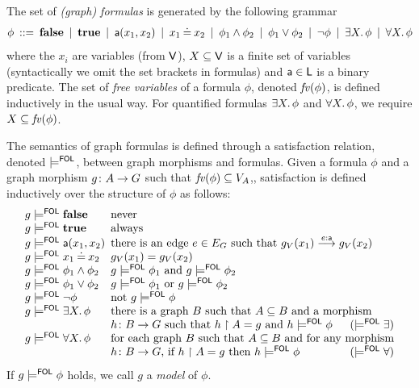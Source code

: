 \begin{definition}
  \label{def:graph-formulas}
The set of \emph{(graph) formulas} is generated by the following grammar
%
\[ \phi \:::=\: \textbf{false}
        \:\mid\: \textbf{true}
		\:\mid\: \mathsf{a}(x_1,x_2)
        \:\mid\: x_1 \mathbin{\doteq} x_2
		\:\mid\: \phi_1\wedge \phi_2
		\:\mid\: \phi_1\vee \phi_2
		\:\mid\: \neg\phi
		\:\mid\: \exists X.\, \phi 
		\:\mid\: \forall X.\, \phi 
		\]
where the $x_i$ are variables (from $\mathsf{V}$), $X\subseteq \mathsf{V}$ is a finite set of variables (syntactically we omit the set brackets in formulas) and $\mathsf{a} \in \mathsf{L}$ is a binary predicate. The set of \emph{free variables} of a formula $\phi$, denoted $\mathit{fv}(\phi)$, is defined inductively in the usual way. For quantified formulas $\exists X.\,\phi$ and $\forall X.\,\phi$, we require $X\subseteq \mathit{fv}(\phi)$.

The semantics of graph formulas is defined through a satisfaction relation, denoted $\models^{\mathsf{FOL}}$, between graph morphisms and formulas. Given a formula $\phi$ and a graph morphism $g \colon A \rightarrow G$ such that $\mathit{fv}(\phi) \subseteq V_A$,, satisfaction is defined inductively over the structure of $\phi$ as follows: 
%
\[
\begin{array}{l@{{\enspace}}l@{{\enspace}}}
  g\sat^\FOL \False & \text{never} \\
  g\sat^\FOL \True & \text{always} \\
  g\sat^\FOL \la(x_1,x_2) & \text{there is an edge } e\in E_G \text{ such that } g_V(x_1) \stackrel{e:\la}{\longrightarrow} g_V(x_2)\\
  g\sat^\FOL x_1\Eq x_2 & g_V(x_1)=g_V(x_2) \\
  g\sat^\FOL \phi_1\wedge \phi_2 & g\sat^\FOL \phi_1 \text{ and } g\sat^\FOL \phi_2 \\
  g\sat^\FOL \phi_1\vee \phi_2 & g\sat^\FOL \phi_1 \text{ or } g\sat^\FOL \phi_2 \\
  g\sat^\FOL \neg\phi & \text{not } g\sat^\FOL \phi \\
  g\sat^\FOL \exists X\st \phi  & \text{there is a graph $B$ such that $A \subseteq B$ and a morphism}\\ & \text{$h\of B\to G$ such that $h \restr A = g$ and $h \sat^\FOL \phi$}\hfill (\sat^\FOL \exists)\\
  g\sat^\FOL \forall X\st \phi  & \text{for each graph $B$ such that $A \subseteq B$ and for any morphism}\\ & \text{$h\of B\to G$, if  $h \restr A = g$ then $h \sat^\FOL \phi$} \hfill (\sat^\FOL \forall)
  \end{array}
  \]
%
If $g \models^{\mathsf{FOL}} \phi$ holds, we call $g$ a \emph{model} of $\phi$. 
\end{definition}
